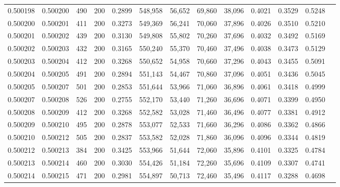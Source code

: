 \begin{tabular}{rrrrrrrrrrrrr}
0.500198 & 0.500200 &    490 & 200 &                                     0.2899 & 548,958 &  56,652 &  69,860 &  38,096 & 0.4021 & 0.3529 & 0.5248 \\
0.500200 & 0.500201 &    411 & 200 &                                     0.3273 & 549,369 &  56,241 &  70,060 &  37,896 & 0.4026 & 0.3510 & 0.5210 \\
0.500201 & 0.500202 &    439 & 200 &                                     0.3130 & 549,808 &  55,802 &  70,260 &  37,696 & 0.4032 & 0.3492 & 0.5169 \\
0.500202 & 0.500203 &    432 & 200 &                                     0.3165 & 550,240 &  55,370 &  70,460 &  37,496 & 0.4038 & 0.3473 & 0.5129 \\
0.500203 & 0.500204 &    412 & 200 &                                     0.3268 & 550,652 &  54,958 &  70,660 &  37,296 & 0.4043 & 0.3455 & 0.5091 \\
0.500204 & 0.500205 &    491 & 200 &                                     0.2894 & 551,143 &  54,467 &  70,860 &  37,096 & 0.4051 & 0.3436 & 0.5045 \\
0.500205 & 0.500207 &    501 & 200 &                                     0.2853 & 551,644 &  53,966 &  71,060 &  36,896 & 0.4061 & 0.3418 & 0.4999 \\
0.500207 & 0.500208 &    526 & 200 &                                     0.2755 & 552,170 &  53,440 &  71,260 &  36,696 & 0.4071 & 0.3399 & 0.4950 \\
0.500208 & 0.500209 &    412 & 200 &                                     0.3268 & 552,582 &  53,028 &  71,460 &  36,496 & 0.4077 & 0.3381 & 0.4912 \\
0.500209 & 0.500210 &    495 & 200 &                                     0.2878 & 553,077 &  52,533 &  71,660 &  36,296 & 0.4086 & 0.3362 & 0.4866 \\
0.500210 & 0.500212 &    505 & 200 &                                     0.2837 & 553,582 &  52,028 &  71,860 &  36,096 & 0.4096 & 0.3344 & 0.4819 \\
0.500212 & 0.500213 &    384 & 200 &                                     0.3425 & 553,966 &  51,644 &  72,060 &  35,896 & 0.4101 & 0.3325 & 0.4784 \\
0.500213 & 0.500214 &    460 & 200 &                                     0.3030 & 554,426 &  51,184 &  72,260 &  35,696 & 0.4109 & 0.3307 & 0.4741 \\
0.500214 & 0.500215 &    471 & 200 &                                     0.2981 & 554,897 &  50,713 &  72,460 &  35,496 & 0.4117 & 0.3288 & 0.4698 \\

\end{tabular}

